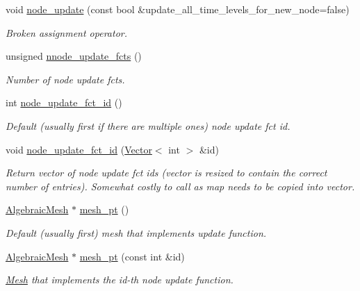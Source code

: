 \begin{DoxyCompactItemize}
void \hyperlink{classoomph_1_1AlgebraicNode_a754dc8fcac3382a07f60262c9792c84c}{node\+\_\+update} (const bool \&update\+\_\+all\+\_\+time\+\_\+levels\+\_\+for\+\_\+new\+\_\+node=false)
\begin{DoxyCompactList}\small\item\em Broken assignment operator. \end{DoxyCompactList}\item 
unsigned \hyperlink{classoomph_1_1AlgebraicNode_a8c9e49f378f2dc9e93e62e281bf58d27}{nnode\+\_\+update\+\_\+fcts} ()
\begin{DoxyCompactList}\small\item\em Number of node update fcts. \end{DoxyCompactList}\item 
int \hyperlink{classoomph_1_1AlgebraicNode_a8887f3a7c445b098835a7703c3a19bd2}{node\+\_\+update\+\_\+fct\+\_\+id} ()
\begin{DoxyCompactList}\small\item\em Default (usually first if there are multiple ones) node update fct id. \end{DoxyCompactList}\item 
void \hyperlink{classoomph_1_1AlgebraicNode_a6b910e50ee47113aa0256e46043b0f27}{node\+\_\+update\+\_\+fct\+\_\+id} (\hyperlink{classoomph_1_1Vector}{Vector}$<$ int $>$ \&id)
\begin{DoxyCompactList}\small\item\em Return vector of node update fct ids (vector is resized to contain the correct number of entries). Somewhat costly to call as map needs to be copied into vector. \end{DoxyCompactList}\item 
\hyperlink{classoomph_1_1AlgebraicMesh}{Algebraic\+Mesh} $\ast$ \hyperlink{classoomph_1_1AlgebraicNode_a929a96691397e1990fdf785dfcea5c07}{mesh\+\_\+pt} ()
\begin{DoxyCompactList}\small\item\em Default (usually first) mesh that implements update function. \end{DoxyCompactList}\item 
\hyperlink{classoomph_1_1AlgebraicMesh}{Algebraic\+Mesh} $\ast$ \hyperlink{classoomph_1_1AlgebraicNode_ae07189bb28dcba7d31e736de391fe54f}{mesh\+\_\+pt} (const int \&id)
\begin{DoxyCompactList}\small\item\em \hyperlink{classoomph_1_1Mesh}{Mesh} that implements the id-\/th node update function. \end{DoxyCompactList}\item 

\end{DoxyCompactItemize}
